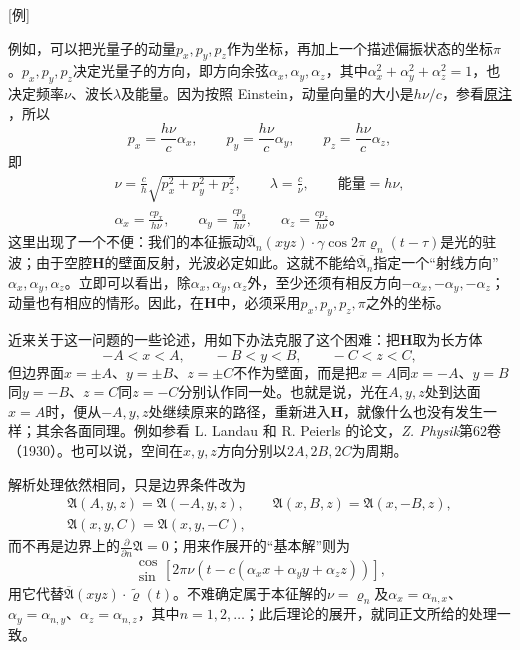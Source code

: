 \documentclass[fontsize=13pt,twoside,openany,headings=normal,parskip=false,bookmarkpackage=false,DIV=calc]{scrbook}
\begin{document}
[例]{例如，可以把光量子的动量$p_x,\allowbreak p_y,\allowbreak p_z$作为坐标，再加上一个描述偏振状态的坐标$\pi$。$p_x,\allowbreak p_y,\allowbreak p_z$决定光量子的方向，即方向余弦$\alpha_x,\allowbreak \alpha_y,\allowbreak \alpha_z$，其中$\alpha_x^2+\alpha_y^2+\alpha_z^2=1$，也决定频率$\nu$、波长$\lambda$及能量。因为按照 Einstein，动量向量的大小是$h\nu/c$，参看\CJKglue \hyperlink{note-134}{原注 }，所以
\[
p_x=\frac{h\nu}{c}\alpha_x,\qquad p_y=\frac{h\nu}{c}\alpha_y,\qquad p_z=\frac{h\nu}{c}\alpha_z,
\]
即
\begin{gather*}
\nu=\frac ch\sqrt{p_x^2+p_y^2+p_z^2},\qquad \lambda=\frac c\nu,\qquad \text{能量}=h\nu,\\
\alpha_x=\frac{cp_x}{h\nu},\qquad\alpha_y=\frac{cp_y}{h\nu},\qquad\alpha_z=\frac{cp_z}{h\nu}\text{。}
\end{gather*}
这里出现了一个不便：我们的本征振动$\overline{\mathfrak A}_n(xyz)\cdot\gamma\cos2\pi\varrho_n(t-\tau)$是光的驻波；由于空腔$\boldsymbol H$的壁面反射，光波必定如此。这就不能给$\overline{\mathfrak A}_n$指定一个“射线方向”$\alpha_x,\allowbreak \alpha_y,\allowbreak \alpha_z$。立即可以看出，除$\alpha_x,\allowbreak \alpha_y,\allowbreak \alpha_z$外，至少还须有相反方向$-\alpha_x,\allowbreak -\alpha_y,\allowbreak -\alpha_z$；动量也有相应的情形。因此，在$\boldsymbol H$中，必须采用$p_x,\allowbreak p_y,\allowbreak p_z,\allowbreak \pi$之外的坐标。

近来关于这一问题的一些论述，用如下办法克服了这个困难：把$\boldsymbol H$取为长方体
\[
-A<x<A,\qquad-B<y<B,\qquad-C<z<C,
\]
但边界面$x=\pm A$、$y=\pm B$、$z=\pm C$不作为壁面，而是把$x=A$同$x=-A$、$y=B$同$y=-B$、$z=C$同$z=-C$分别认作同一处。也就是说，光在$A,\allowbreak y,\allowbreak z$处到达面$x=A$时，\hypertarget{origpage-254}{}\label{origpage-254}便从$-A,\allowbreak y,\allowbreak z$处继续原来的路径，重新进入$\boldsymbol H$，就像什么也没有发生一样；其余各面同理。例如参看 L. Landau 和 R. Peierls 的论文，\emph{Z. Physik}第62卷（1930）。也可以说，空间在$x,\allowbreak y,\allowbreak z$方向分别以$2A,\allowbreak 2B,\allowbreak 2C$为周期。

解析处理依然相同，只是边界条件改为
\begin{gather*}
\mathfrak A(A,y,z)=\mathfrak A(-A,y,z),\qquad
\mathfrak A(x,B,z)=\mathfrak A(x,-B,z),\\
\mathfrak A(x,y,C)=\mathfrak A(x,y,-C),
\end{gather*}
而不再是边界上的$\frac\partial{\partial n}\mathfrak A=0$；用来作展开的“基本解”则为
\[
\begin{matrix}\cos\\\sin\end{matrix}[2\pi\nu(t-c(\alpha_xx+\alpha_yy+\alpha_zz))],
\]
用它代替$\overline{\mathfrak A}(xyz)\cdot\widetilde\varrho(t)$。不难确定属于本征解的$\nu=\varrho_n$及$\alpha_x=\alpha_{n,\allowbreak x}$、$\alpha_y=\alpha_{n,\allowbreak y}$、$\alpha_z=\alpha_{n,\allowbreak z}$，其中$n=1,\allowbreak 2,\allowbreak \ldots$；此后理论的展开，就同正文所给的处理一致。}
\end{document}
